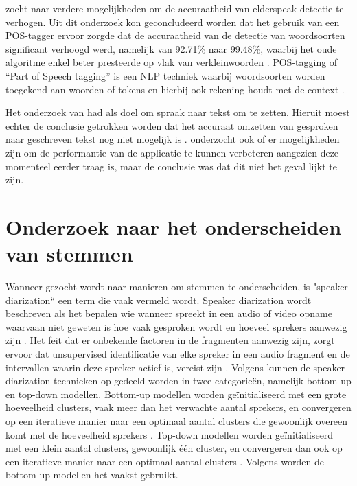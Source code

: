 \textcite{Branden2024} zocht naar verdere mogelijkheden om de accuraatheid van elderspeak detectie te verhogen. Uit dit onderzoek kon geconcludeerd worden dat het gebruik van een POS-tagger ervoor zorgde dat de accuraatheid van de detectie van woordsoorten significant verhoogd werd, namelijk van 92.71\% naar 99.48\%, waarbij het oude algoritme enkel beter presteerde op vlak van verkleinwoorden \autocite{Branden2024}. POS-tagging of ``Part of Speech tagging'' is een NLP techniek waarbij woordsoorten worden toegekend aan woorden of tokens en hierbij ook rekening houdt met de context \autocite{Branden2024}.

Het onderzoek van \textcite{Schryver2024} had als doel om spraak naar tekst om te zetten. Hieruit moest echter de conclusie getrokken worden dat het accuraat omzetten van gesproken naar geschreven tekst nog niet mogelijk is \autocite{Schryver2024}. \textcite{Schryver2024} onderzocht ook of er mogelijkheden zijn om de performantie van de applicatie te kunnen verbeteren aangezien deze momenteel eerder traag is, maar de conclusie was dat dit niet het geval lijkt te zijn.

\section{Onderzoek naar het onderscheiden van stemmen}
Wanneer gezocht wordt naar manieren om stemmen te onderscheiden, is "speaker diarization`` een term die vaak vermeld wordt. Speaker diarization wordt beschreven als het bepalen wie wanneer spreekt in een audio of video opname waarvaan niet geweten is hoe vaak gesproken wordt en hoeveel sprekers aanwezig zijn \autocite{AngueraMiro2012}. Het feit dat er onbekende factoren in de fragmenten aanwezig zijn, zorgt ervoor dat unsupervised identificatie van elke spreker in een audio fragment en de intervallen waarin deze spreker actief is, vereist zijn \autocite{AngueraMiro2012}. Volgens \textcite{AngueraMiro2012} kunnen de speaker diarization technieken op gedeeld worden in twee categorieën, namelijk bottom-up en top-down modellen. Bottom-up modellen worden geïnitialiseerd met een grote hoeveelheid clusters, vaak meer dan het verwachte aantal sprekers, en convergeren op een iteratieve manier naar een optimaal aantal clusters die gewoonlijk overeen komt met de hoeveelheid sprekers \autocite{AngueraMiro2012}. Top-down modellen worden geïnitialiseerd met een klein aantal clusters, gewoonlijk één cluster, en convergeren dan ook op een iteratieve manier naar een optimaal aantal clusters \autocite{AngueraMiro2012}. Volgens \textcite{AngueraMiro2012} worden de bottom-up modellen het vaakst gebruikt.

